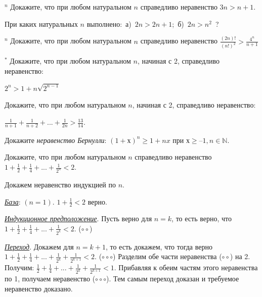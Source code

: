 \begin{thm}$^n$ \label{6.0 n1}
Докажите, что при любом натуральном $n$ справедливо неравенство $3n > n + 1$. 
\end{thm}

\begin{thm}
При каких натуральных $n$ выполнено:~а)~$2n > 2n + 1$;~б)~$2n > n^2$~?
\end{thm}

\begin{thm}$^n$ \label{6.0 n2}
Докажите, что при любом натуральном $n$ справедливо неравенство $\frac{(2n)!}{(n!)^2} > \frac{4^n}{n+1}$
\end{thm}

\begin{thm}$^\ast$
Докажите, что при любом натуральном $n$, начиная с 2, справедливо неравенство: 	
\par \begin{center}
    $2^n > 1 + n \sqrt{2^{n-1}}$
\end{center} \end{thm}

\begin{thm}
Докажите, что при любом натуральном $n$, начиная с 2, справедливо неравенство: 
\par \begin{center}
    $\frac{1}{n + 1} + \frac{1}{n+2} + ... + \frac{1}{2n} > \frac{13}{14}$.
\end{center} \end{thm}

\begin{thm}
Докажите \textit{неравенство Бернулли}: $(1 + х)^n \geq 1 + nx$ при $х \geq –1, n \in \mathbb{N}$.
\end{thm}

\begin{thm}
Докажите, что при любом натуральном $n$ справедливо неравенство $1 + \frac{1}{2} + \frac{1}{4} + ... + \frac{1}{2^n} < 2$.
\end{thm}

\begin{prf} Докажем неравенство индукцией по $n$.
\par
\textit{\underline{База}}: $(n = 1)$. $1 + \frac{1}{2} < 2$ верно.
\par
\textit{\underline{Индукционное предположение}}. Пусть верно для $n = k$, то есть верно, что $1 + \frac{1}{2} + \frac{1}{4} + ... + \frac{1}{2^k} < 2$. ($\circ\circ$)
\par
\textit{\underline{Переход}}. Докажем для $n = k + 1$, то есть докажем, что тогда верно $1 + \frac{1}{2} + \frac{1}{4} + ... + \frac{1}{2^k} + \frac{1}{2^{k+1}} < 2$. ($\circ\circ\circ$) Разделим обе части неравенства ($\circ\circ$) на 2. Получим: $\frac{1}{2} + \frac{1}{4} + ... + \frac{1}{2^k} + \frac{1}{2^{k+1}} < 1$. Прибавляя к обеим частям этого неравенства по 1, получаем неравенство ($\circ\circ\circ$). Тем самым переход доказан и требуемое неравенство доказано. 
\end{prf}

